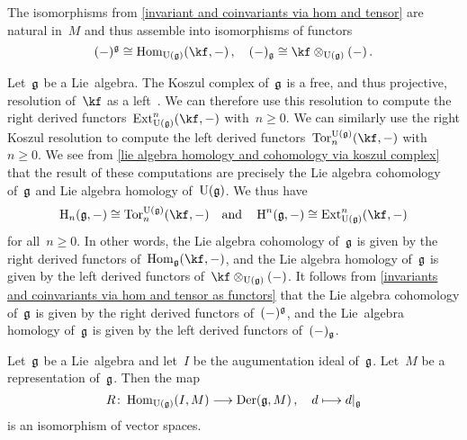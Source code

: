 \begin{remark}
  \label{invariants and coinvariants via hom and tensor as functors}
  The isomorphisms from \cref{invariant and coinvariants via hom and tensor} are natural in~$M$ and thus assemble into isomorphisms of functors
  \[
    (-)^{\glie}
    \cong
    \Hom_{\Univ(\glie)}( \kf, - ) \,,
    \quad
    (-)_{\glie}
    \cong
    \kf \otimes_{\Univ(\glie)} (-) \,.
  \]
\end{remark}


\begin{fluff}
  Let~$\mathfrak{g}$ be a Lie~algebra.
  The Koszul complex of~$\mathfrak{g}$ is a free, and thus projective, resolution of~$\kf$ as a left~\module{$\Univ(\glie)$}.
  We can therefore use this resolution to compute the right derived functors~$\Ext_{\Univ(\glie)}^n(\kf, -)$ with~$n \geq 0$.
  We can similarly use the right Koszul resolution to compute the left derived functors~$\cramped{\Tor^{\Univ(\glie)}_n(\kf, -)}$ with~$n \geq 0$.
  We see from \cref{lie algebra homology and cohomology via koszul complex} that the result of these computations are precisely the Lie algebra cohomology of~$\mathfrak{g}$ and Lie algebra homology of~$\Univ(\glie)$.
  We thus have
  \[
    \Homology_n(\glie, -)
    \cong
    \Tor^{\Univ(\glie)}_n(\kf, -)
    \quad\text{and}\quad
    \Homology^n(\glie, -)
    \cong
    \Ext^n_{\Univ(\glie)}(\kf, -)
  \]
  for all~$n \geq 0$.
  In other words, the Lie algebra cohomology of~$\mathfrak{g}$ is given by the right derived functors of~$\Hom_{\glie}(\kf, -)$, and the Lie algebra homology of~$\mathfrak{g}$ is given by the left derived functors of~$\kf \otimes_{\Univ(\glie)} (-)$.
  It follows from \cref{invariants and coinvariants via hom and tensor as functors} that the Lie algebra cohomology of~$\mathfrak{g}$ is given by the right derived functors of~$(-)^{\mathfrak{g}}$, and the Lie~algebra homology of~$\mathfrak{g}$ is given by the left derived functors of~$(-)_{\mathfrak{g}}$.
\end{fluff}


\begin{proposition}
  Let~$\mathfrak{g}$ be a Lie~algebra and let~$I$ be the augumentation ideal of~$\mathfrak{g}$.
  Let~$M$ be a representation of~$\mathfrak{g}$.
  Then the map
  \[
    R
    \colon
    \Hom_{\Univ(\glie)}(I, M)
    \to
    \Der(\glie, M) \,,
    \quad
    d
    \mapsto
    \restrict{d}{\glie}
  \]
  is an isomorphism of vector spaces.
\end{proposition}


